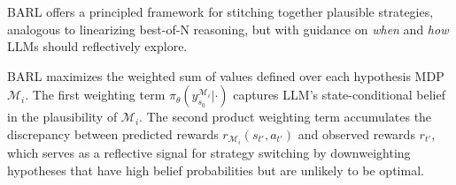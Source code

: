\vspace{-0.3cm}
BARL offers a principled framework for stitching together plausible strategies, analogous to linearizing best-of-N reasoning, but with guidance on \textit{when} and \textit{how} LLMs should reflectively explore.

\begin{remark}\label{remark_switch}
BARL maximizes the weighted sum of values defined over each hypothesis MDP $\mathcal{M}_i$. The first weighting term $\pi_\theta(y_{s_0}^{\mathcal{M}_i}| \cdot)$ captures LLM's state-conditional belief in the plausibility of $\mathcal{M}_i$. The second product weighting term accumulates the discrepancy between predicted rewards $r_{\mathcal{M}_i}(s_{t'}, a_{t'})$ and observed rewards $r_{t'}$, which serves as a reflective signal for strategy switching by downweighting hypotheses that have high belief probabilities but are unlikely to be optimal.
\end{remark}
